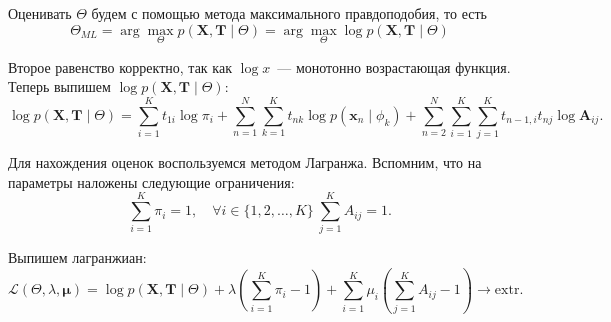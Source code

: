 Оценивать \(\Theta\) будем с помощью метода максимального правдоподобия, то есть
\[
	\Theta_{ML} = \arg\max_{\Theta} p(\mathbf{X}, \mathbf{T} \mid \Theta) = 
	\arg\max_{\Theta} \log p(\mathbf{X}, \mathbf{T} \mid \Theta)
\]

Второе равенство корректно, так как \(\log{x}\)~--- монотонно возрастающая 
функция. Теперь выпишем \(\log p(\mathbf{X}, \mathbf{T} \mid \Theta)\):
\[
	\log p(\mathbf{X}, \mathbf{T} \mid \Theta) = \sum_{i = 1}^{K}t_{1i}\log 
	\pi_{i} + \sum_{n = 1}^{N}\sum_{k = 1}^{K} t_{nk}\log p(\mathbf{x}_{n} \mid 
	\phi_{k}) + \sum_{n = 2}^{N}\sum_{i = 1}^{K}\sum_{j = 1}^{K}t_{n - 1, 
	i}t_{nj}\log \mathbf{A}_{ij}.
\]

Для нахождения оценок воспользуемся методом Лагранжа. Вспомним, что на 
параметры наложены следующие ограничения:
\[
	\sum_{i = 1}^{K} \pi_{i} = 1, \quad \forall i \in \{1, 2, \ldots, K\}\ 
	\sum_{j = 1}^{K} A_{ij} = 1.
\]

Выпишем лагранжиан:
\[
	\mathcal{L}(\Theta, \lambda, \bm{\mu}) = \log p(\mathbf{X}, \mathbf{T} \mid 
	\Theta) + \lambda\left(\sum_{i = 1}^{K} \pi_{i} - 1\right) + \sum_{i = 
	1}^{K}\mu_{i}\left(\sum_{j = 1}^{K} A_{ij} - 1\right) \to \mathrm{extr}.
\]

